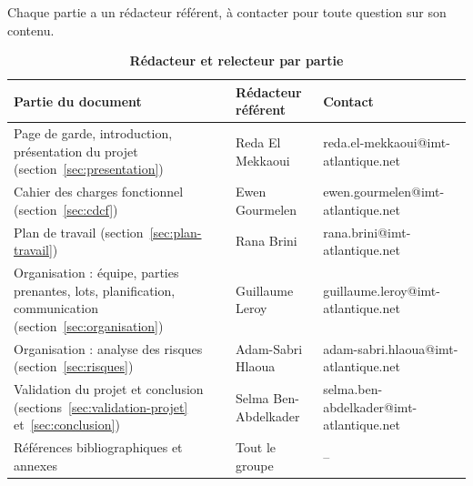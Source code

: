 \documentclass[11pt,a4paper,french]{article}
\begin{document}
\begin{table}[h]
    \centering
    \caption*{\large \textbf{Rédacteur et relecteur par partie}}
    \small
    Chaque partie a un rédacteur référent, à contacter pour toute question sur son contenu.\par\vspace{0.2cm}
    \begin{tabularx}{\textwidth}{@{}Lp{3.4cm}p{4.6cm}@{}}
        \toprule
        \textbf{Partie du document} & \textbf{Rédacteur référent} & \textbf{Contact} \\
        \midrule
        Page de garde, introduction, présentation du projet (section~\ref{sec:presentation}) & Reda El Mekkaoui & reda.el-mekkaoui@imt-atlantique.net \\
        Cahier des charges fonctionnel (section~\ref{sec:cdcf}) & Ewen Gourmelen & ewen.gourmelen@imt-atlantique.net \\
        Plan de travail (section~\ref{sec:plan-travail}) & Rana Brini & rana.brini@imt-atlantique.net \\
        Organisation : équipe, parties prenantes, lots, planification, communication (section~\ref{sec:organisation}) & Guillaume Leroy & guillaume.leroy@imt-atlantique.net \\
        Organisation : analyse des risques (section~\ref{sec:risques}) & Adam-Sabri Hlaoua & adam-sabri.hlaoua@imt-atlantique.net \\
        Validation du projet et conclusion (sections~\ref{sec:validation-projet} et~\ref{sec:conclusion}) & Selma Ben-Abdelkader & selma.ben-abdelkader@imt-atlantique.net \\
        Références bibliographiques et annexes & Tout le groupe & -- \\
        \bottomrule
    \end{tabularx}
\end{table}

\newpage

\IMTAsommaire
\newpage
\end{document}
